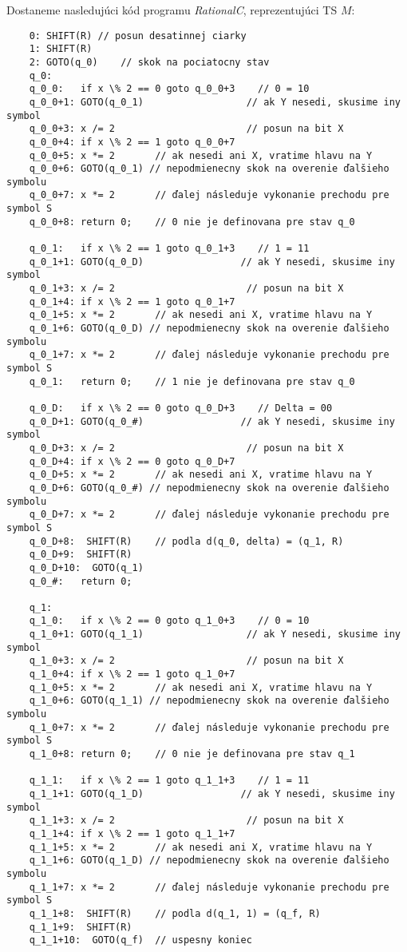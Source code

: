 \documentclass[10pt]{article}
\begin{document}
    Dostaneme nasledujúci kód programu \textit{RationalC}, reprezentujúci TS $M$:
    \footnotesize \begin{verbatim}
    0: SHIFT(R) // posun desatinnej ciarky
    1: SHIFT(R) 
    2: GOTO(q_0)    // skok na pociatocny stav
    q_0:
    q_0_0:   if x \% 2 == 0 goto q_0_0+3    // 0 = 10
    q_0_0+1: GOTO(q_0_1)                  // ak Y nesedi, skusime iny symbol 
    q_0_0+3: x /= 2                       // posun na bit X
    q_0_0+4: if x \% 2 == 1 goto q_0_0+7 
    q_0_0+5: x *= 2       // ak nesedi ani X, vratime hlavu na Y
    q_0_0+6: GOTO(q_0_1) // nepodmienecny skok na overenie ďalšieho symbolu
    q_0_0+7: x *= 2       // ďalej následuje vykonanie prechodu pre symbol S
    q_0_0+8: return 0;    // 0 nie je definovana pre stav q_0

    q_0_1:   if x \% 2 == 1 goto q_0_1+3    // 1 = 11
    q_0_1+1: GOTO(q_0_D)                 // ak Y nesedi, skusime iny symbol 
    q_0_1+3: x /= 2                       // posun na bit X
    q_0_1+4: if x \% 2 == 1 goto q_0_1+7 
    q_0_1+5: x *= 2       // ak nesedi ani X, vratime hlavu na Y
    q_0_1+6: GOTO(q_0_D) // nepodmienecny skok na overenie ďalšieho symbolu
    q_0_1+7: x *= 2       // ďalej následuje vykonanie prechodu pre symbol S
    q_0_1:   return 0;    // 1 nie je definovana pre stav q_0

    q_0_D:   if x \% 2 == 0 goto q_0_D+3    // Delta = 00
    q_0_D+1: GOTO(q_0_#)                 // ak Y nesedi, skusime iny symbol 
    q_0_D+3: x /= 2                       // posun na bit X
    q_0_D+4: if x \% 2 == 0 goto q_0_D+7 
    q_0_D+5: x *= 2       // ak nesedi ani X, vratime hlavu na Y
    q_0_D+6: GOTO(q_0_#) // nepodmienecny skok na overenie ďalšieho symbolu
    q_0_D+7: x *= 2       // ďalej následuje vykonanie prechodu pre symbol S
    q_0_D+8:  SHIFT(R)    // podla d(q_0, delta) = (q_1, R) 
    q_0_D+9:  SHIFT(R)  
    q_0_D+10:  GOTO(q_1) 
    q_0_#:   return 0;

    q_1:
    q_1_0:   if x \% 2 == 0 goto q_1_0+3    // 0 = 10
    q_1_0+1: GOTO(q_1_1)                  // ak Y nesedi, skusime iny symbol 
    q_1_0+3: x /= 2                       // posun na bit X
    q_1_0+4: if x \% 2 == 1 goto q_1_0+7 
    q_1_0+5: x *= 2       // ak nesedi ani X, vratime hlavu na Y
    q_1_0+6: GOTO(q_1_1) // nepodmienecny skok na overenie ďalšieho symbolu
    q_1_0+7: x *= 2       // ďalej následuje vykonanie prechodu pre symbol S
    q_1_0+8: return 0;    // 0 nie je definovana pre stav q_1

    q_1_1:   if x \% 2 == 1 goto q_1_1+3    // 1 = 11
    q_1_1+1: GOTO(q_1_D)                 // ak Y nesedi, skusime iny symbol 
    q_1_1+3: x /= 2                       // posun na bit X
    q_1_1+4: if x \% 2 == 1 goto q_1_1+7 
    q_1_1+5: x *= 2       // ak nesedi ani X, vratime hlavu na Y
    q_1_1+6: GOTO(q_1_D) // nepodmienecny skok na overenie ďalšieho symbolu
    q_1_1+7: x *= 2       // ďalej následuje vykonanie prechodu pre symbol S
    q_1_1+8:  SHIFT(R)    // podla d(q_1, 1) = (q_f, R) 
    q_1_1+9:  SHIFT(R)  
    q_1_1+10:  GOTO(q_f)  // uspesny koniec
 

\end{verbatim}
\end{document}
